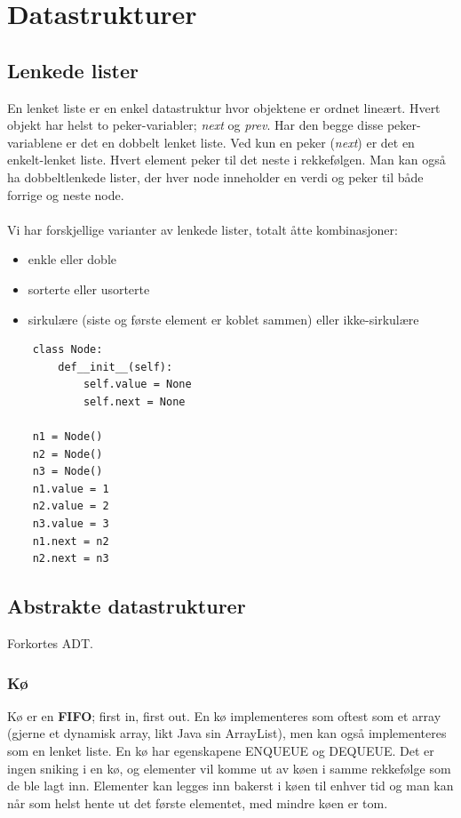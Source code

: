 \section{Datastrukturer}

\subsection{Lenkede lister}
En lenket liste er en enkel datastruktur hvor objektene er ordnet lineært. Hvert objekt har helst to peker-variabler; \textit{next} og \textit{prev}. Har den begge disse peker-variablene er det en dobbelt lenket liste. Ved kun en peker (\textit{next}) er det en enkelt-lenket liste. Hvert element peker til det neste i rekkefølgen. Man kan også ha dobbeltlenkede lister, der hver node inneholder en verdi og peker til både forrige og neste node.
\\\\
Vi har forskjellige varianter av lenkede lister, totalt åtte kombinasjoner:
\begin{itemize}
    \item enkle eller doble
    \item sorterte eller usorterte
    \item sirkulære (siste og første element er koblet sammen) eller ikke-sirkulære
\end{itemize}

\begin{lstlisting}
    class Node:
    	def__init__(self):
    		self.value = None
    		self.next = None
    
    n1 = Node()
    n2 = Node()
    n3 = Node()
    n1.value = 1
    n2.value = 2
    n3.value = 3
    n1.next = n2
    n2.next = n3
\end{lstlisting}

\subsection{Abstrakte datastrukturer}
Forkortes ADT.

\subsubsection{Kø}
Kø er en \textbf{FIFO}; first in, first out. En kø implementeres som oftest som et array (gjerne et dynamisk array, likt Java sin ArrayList), men kan også implementeres som en lenket liste. En kø har egenskapene ENQUEUE og DEQUEUE. Det er ingen sniking i en kø, og elementer vil komme ut av køen i samme rekkefølge som de ble lagt inn. Elementer kan legges inn bakerst i køen til enhver tid og man kan når som helst hente ut det første elementet, med mindre køen er tom.


